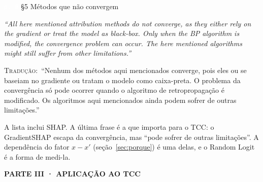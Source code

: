 \documentclass[11pt,a4paper]{article}
\newcommand{\pagechip}[1]{{\setlength{\fboxsep}{1.5pt}\colorbox{cAcc}{\textcolor{white}{\scriptsize\texttt{#1}}}}}
\newcommand{\partbar}[1]{\par\vspace{1.2em}\noindent\colorbox{black!80}{\parbox{\dimexpr\linewidth-2\fboxsep}{\color{white}\bfseries\sffamily\MakeUppercase{#1}}}\par\vspace{0.4em}}
\newenvironment{origquote}{\par\itshape\small}{\par}
\newenvironment{tradquote}{\par\small\textsc{Tradução:}\ }{\par}
\newcommand{\explab}[1]{\par\smallskip{\small\color{cAcc}\textbf{\MakeUppercase{#1}}}\par}
\begin{document}
\begin{citacard}{\pagechip{p. 8} §5 Métodos que não convergem}
\begin{origquote}“All here mentioned attribution methods do not converge, as they either rely on the gradient or treat the model as black-box. Only when the BP algorithm is modified, the convergence problem can occur. The here mentioned algorithms might still suffer from other limitations.”\end{origquote}
\begin{tradquote}“Nenhum dos métodos aqui mencionados converge, pois eles ou se baseiam no gradiente ou tratam o modelo como caixa-preta. O problema da convergência só pode ocorrer quando o algoritmo de retropropagação é modificado. Os algoritmos aqui mencionados ainda podem sofrer de outras limitações.”\end{tradquote}
\explab{Explicação}
A lista inclui SHAP. A última frase é a que importa para o TCC: o GradientSHAP escapa da convergência, mas “pode sofrer de outras limitações”. A dependência do fator $x - x'$ (seção~\ref{sec:porque}) é uma delas, e o Random Logit é a forma de medi-la.
\end{citacard}

\partbar{Parte III · Aplicação ao TCC}
\end{document}
